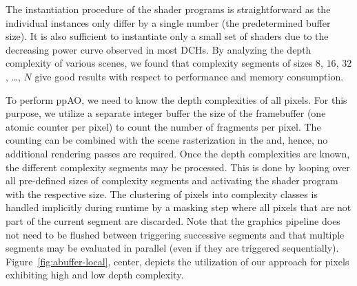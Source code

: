 \documentclass{egpubl}
\makeatletter
\newcommand{\removelatexerror}{\let\@latex@error\@gobble}
\newcommand{\dch}{DCH}
\newcommand{\stencil}{ppAO}
\makeatother
\begin{document}
\begingroup
\removelatexerror%
\begin{algorithm}[H]
  \tcp{\sFill}
\end{algorithm}
\endgroup

The instantiation procedure of the shader programs is straightforward as the individual instances only differ by a single number (the predetermined buffer size). 
It is also sufficient to instantiate only a small set of shaders due to the decreasing power curve observed in most \dch{}s. 
By analyzing the depth complexity of various scenes, we found that complexity segments of sizes $8$, $16$, $32$, \ldots, $N$ give good results with respect to performance and memory consumption.

To perform \stencil, we need to know the depth complexities of all pixels. 
For this purpose, we utilize a separate integer buffer the size of the framebuffer (one atomic counter per pixel) to count the number of fragments per pixel.
The counting can be combined with the scene rasterization in the \sFill{} and, hence, no additional rendering passes are required.
%
Once the depth complexities are known, the different complexity segments may be processed. 
This is done by looping over all pre-defined sizes of complexity segments and activating the shader program with the respective \bArray{} size. 
The clustering of pixels into complexity classes is handled implicitly during runtime by a masking step where all pixels that are not part of the current segment are discarded. 
Note that the graphics pipeline does not need to be flushed between triggering successive segments and that multiple segments may be evaluated in parallel (even if they are triggered sequentially). 
Figure~\ref{fig:abuffer-local}, center, depicts the utilization of our approach for pixels exhibiting high and low depth complexity.
\end{document}
